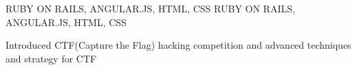 \begin{cventries}
  \cventry
    {RUBY ON RAILS, ANGULAR.JS, HTML, CSS}
    {RUBY ON RAILS, ANGULAR.JS, HTML, CSS}
    {}
    {}
    {
      \begin{cvitems}
        \item {Introduced CTF(Capture the Flag) hacking competition and advanced techniques and strategy for CTF}
      \end{cvitems}
    }
\end{cventries}
